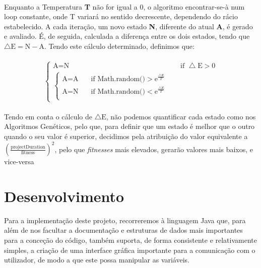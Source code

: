 \documentclass[a4paper]{article}
\begin{document}
\paragraph{}
Enquanto a Temperatura \textbf{T} não for igual a 0, o algoritmo encontrar-se-à num loop constante, onde T variará no sentido decrescente, dependendo do rácio estabelecido. A cada iteração, um novo estado \textbf{N}, diferente do atual \textbf{A}, é gerado e avaliado. É, de seguida, calculada a diferença entre os dois estados, tendo que $\bigtriangleup \textrm{E} = \textrm{N} - \textrm{A}$. Tendo este cálculo determinado, definimos que:
\paragraph{}
\[
\begin{cases}
\textrm{A} = \textrm{N}      & \quad \text{if } \bigtriangleup \textrm{E} > 0\\
	\begin{cases}
	\textrm{A} = \textrm{A}     & \quad \text{if } \textrm{Math.random()} > \mathrm{e}^{\frac{\bigtriangleup \textrm{E}}{T}}\\
	\textrm{A} = \textrm{N}  	& \quad \text{if } \textrm{Math.random()} < \mathrm{e}^{\frac{\bigtriangleup \textrm{E}}{T}}\\
	\end{cases}
\end{cases}
\]
\paragraph{}
Tendo em conta o cálculo de $\bigtriangleup \textrm{E}$, não podemos quantificar cada estado como nos Algoritmos Genéticos, pelo que, para definir que um estado é melhor que o outro quando o seu valor é superior, decidimos pela atribuição do valor equivalente a $\mathrm{(\frac{projectDuration}{\textrm{fitness}})}^2$, pelo que \textit{fitnesses} mais elevados, gerarão valores mais baixos, e vice-versa
\newpage
\section{Desenvolvimento}
 Para a implementação deste projeto, recorreremos à linguagem Java que, para além de nos facultar a documentação e estruturas de dados mais importantes para a conceção do código, também suporta, de forma consistente e relativamente simples, a criação de uma interface gráfica importante para a comunicação com o utilizador, de modo a que este possa manipular as variáveis.
\end{document}
